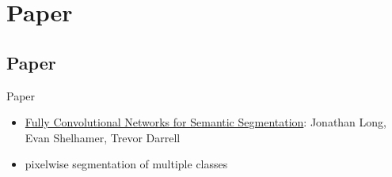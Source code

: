 \section{Paper}

\subsection{Paper}

\begin{frame}{Paper}
    \begin{itemize}
        \item \href{http://arxiv.org/abs/1411.4038}{Fully Convolutional Networks for Semantic Segmentation}:
              Jonathan Long, Evan Shelhamer, Trevor Darrell
        \item pixelwise segmentation of multiple classes
    \end{itemize}
    
   
\end{frame}

